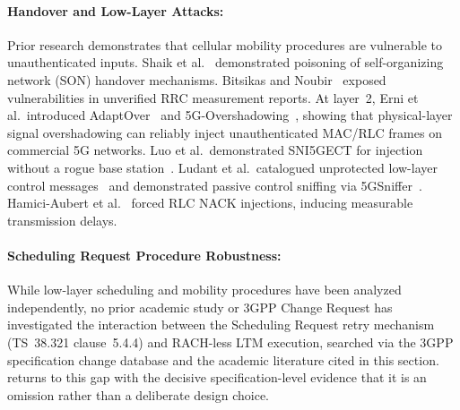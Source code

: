 \paragraph{Handover and Low-Layer Attacks:}
Prior research demonstrates that cellular mobility procedures are vulnerable to unauthenticated inputs.
Shaik et al.~\cite{shaik2018rogue} demonstrated poisoning of self-organizing network (SON) handover
mechanisms. Bitsikas and Noubir~\cite{bitsikas2021donthandover} exposed vulnerabilities in unverified
RRC measurement reports. At layer~2, Erni et al.\ introduced AdaptOver~\cite{erni2022adaptover} and
5G-Overshadowing~\cite{erni20265gone}, showing that physical-layer signal overshadowing can reliably
inject unauthenticated MAC/RLC frames on commercial 5G networks. Luo et al.\ demonstrated SNI5GECT for
injection without a rogue base station~\cite{luo2025sni5gect}. Ludant et al.\ catalogued unprotected
low-layer control messages~\cite{ludant2025lowlayer} and demonstrated passive control sniffing via
5GSniffer~\cite{ludant2023sniffing}. Hamici-Aubert et al.~\cite{hamici2024overshadowing} forced RLC NACK
injections, inducing measurable transmission delays.

\paragraph{Scheduling Request Procedure Robustness:}
While low-layer scheduling and mobility procedures have been analyzed independently, no prior academic
study or 3GPP Change Request has investigated the interaction between the Scheduling Request retry
mechanism (TS~38.321 clause~5.4.4) and RACH-less LTM execution, searched via the 3GPP specification
change database and the academic literature cited in this section.  returns to this gap
with the decisive specification-level evidence that it is an omission rather than a deliberate design
choice.

